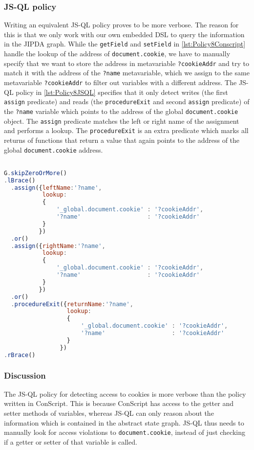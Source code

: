 \subsubsection*{JS-QL policy}

Writing an equivalent JS-QL policy proves to be more verbose. The reason for this is that we only work with our own embedded DSL to query the information in the JIPDA graph. While the \texttt{getField} and \texttt{setField} in \ref{lst:Policy8Conscript} handle the lookup of the address of \texttt{document.cookie}, we have to manually specify that we want to store the address in metavariable \texttt{?cookieAddr} and try to match it with the address of the \texttt{?name} metavariable, which we assign to the same metavariable \texttt{?cookieAddr} to filter out variables with a different address. The JS-QL policy in \ref{lst:Policy8JSQL} specifies that it only detect writes (the first \texttt{assign} predicate) and reads (the \texttt{procedureExit} and second \texttt{assign} predicate) of the \texttt{?name} variable which points to the address of the global \texttt{document.cookie} object. The \texttt{assign} predicate matches the left or right name of the assignment and performs a lookup. The \texttt{procedureExit} is an extra predicate which marks all returns of functions that return a value that again points to the address of the global \texttt{document.cookie} address.


\begin{lstlisting}[label={lst:Policy8JSQL},language=JavaScript,caption=Policy 8 in JS-QL,mathescape=true]  % float=t?

G.skipZeroOrMore()
.lBrace()
  .assign({leftName:'?name',
           lookup:
           {
               '_global.document.cookie' : '?cookieAddr',
               '?name'                   : '?cookieAddr' 
           }
          })
  .or()
  .assign({rightName:'?name',
           lookup:
           {
               '_global.document.cookie' : '?cookieAddr',
               '?name'                   : '?cookieAddr' 
           }
          })
  .or()
  .procedureExit({returnName:'?name',
                  lookup:
                  {
                      '_global.document.cookie' : '?cookieAddr',
                      '?name'                   : '?cookieAddr'  
                  }
                })
.rBrace()
\end{lstlisting}

\subsubsection*{Discussion}
The JS-QL policy for detecting access to cookies is more verbose than the policy written in ConScript. This is because ConScript has access to the getter and setter methods of variables, whereas JS-QL can only reason about the information which is contained in the abstract state graph. JS-QL thus needs to manually look for access violations to \texttt{document.cookie}, instead of just checking if a getter or setter of that variable is called.

